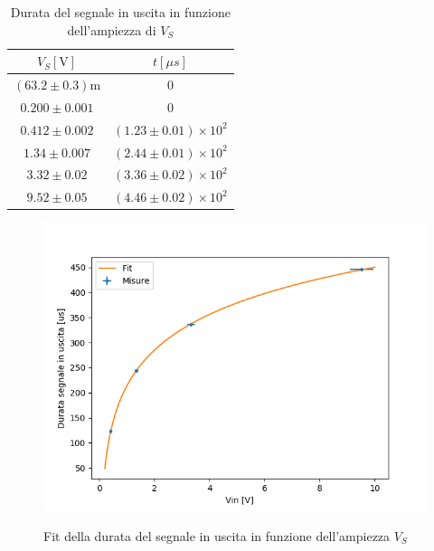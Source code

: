 \documentclass{article}
\begin{document}
		\begin{table}[h]
			\label{tab:durata}
			\begin{center}
				\begin{tabular}{cc}
					\hline
					$V_S [\mathrm{V}]$&$t[\mu s]$ \\
					\hline
					$(63.2\pm0.3) \mathrm{m}$ & $0$ \\
					$0.200\pm0.001$ & $0$ \\
					$0.412\pm0.002$ & $(1.23\pm0.01)\times 10^{2}$ \\
					$1.34\pm0.007$ & $(2.44\pm0.01)\times 10^{2}$ \\
					$3.32\pm0.02$ & $(3.36\pm0.02)\times 10^{2}$ \\
					$9.52\pm0.05$ & 	$(4.46\pm0.02)\times 10^{2}$ \\
					\hline
				\end{tabular}
			\end{center}
			\caption{Durata del segnale in uscita in funzione dell'ampiezza di $V_S$}
		\end{table}
		
		\begin{figure}
			\centering
			\includegraphics[width=\linewidth]{immagini/1c.png}
			\label{fit:1c}
			\caption{Fit della durata del segnale in uscita in funzione dell'ampiezza $V_S$}
		\end{figure}
		
\end{document}
